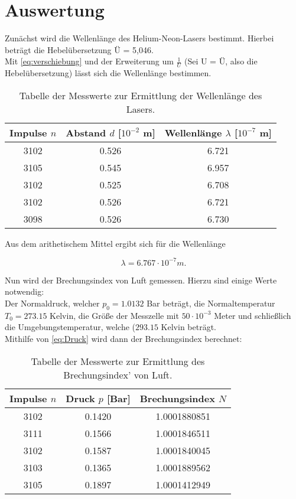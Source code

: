 \section{Auswertung}
\label{sec:Auswertung}

Zunächst wird die Wellenlänge des Helium-Neon-Lasers bestimmt. Hierbei beträgt die Hebelübersetzung Ü = 5,046.\\
Mit \autoref{eq:verschiebung} und der Erweiterung um \(\frac{1}{U}\) (Sei U = Ü, also die Hebelübersetzung) lässt sich die Wellenlänge bestimmen.

\begin{table}
  \centering
  \caption{Tabelle der Messwerte zur Ermittlung der Wellenlänge des Lasers.}
  \label{tab:tab1}
  \begin{tabular}{c | c | c}
    \toprule
    Impulse \(n\) & Abstand \(d\) [\(10^{-2}\) m] & Wellenlänge \(\lambda\) [\(10^{-7}\) m]\\
    \midrule
    3102 & 0.526 & 6.721\\
    3105 & 0.545 & 6.957\\
    3102 & 0.525 & 6.708\\
    3102 & 0.526 & 6.721\\
    3098 & 0.526 & 6.730\\
    \bottomrule
  \end{tabular}
\end{table}

Aus dem arithetischem Mittel ergibt sich für die Wellenlänge 

\begin{equation}
  \lambda = 6.767 \cdot 10^{-7} m.
\end{equation}

Nun wird der Brechungsindex von Luft gemessen. Hierzu sind einige Werte notwendig:\\
Der Normaldruck, welcher \(p_0 = 1.0132\) Bar beträgt, die Normaltemperatur \(T_0 = 273.15\) Kelvin, die Größe der Messzelle mit \(50 \cdot 10^{-3}\) Meter und schließlich die Umgebungstemperatur, welche (\(293.15\) Kelvin beträgt.\\
Mithilfe von \autoref{eq:Druck} wird dann der Brechungsindex berechnet:

\begin{table}
  \centering
  \caption{Tabelle der Messwerte zur Ermittlung des Brechungsindex' von Luft.}
  \label{tab:tab2}
  \begin{tabular}{c | c | c}
    \toprule
    Impulse \(n\) & Druck \(p\) [Bar] & Brechungsindex \(N\)\\
    \midrule
    3102 & 0.1420 & 1.0001880851\\
    3111 & 0.1566 & 1.0001846511\\
    3102 & 0.1587 & 1.0001840045\\
    3103 & 0.1365 & 1.0001889562\\
    3105 & 0.1897 & 1.0001412949\\
    \bottomrule
  \end{tabular}
\end{table}

